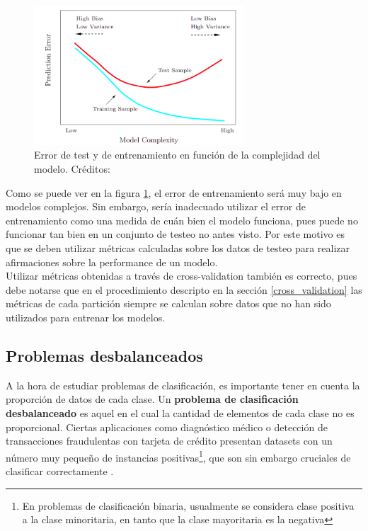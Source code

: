 \begin{figure}[h!]
\begin{center}
  \includegraphics[width=0.7\textwidth]{Kap1/tradeoff.png} 
  \end{center}
 \caption{ Error de test y de entrenamiento en función de la complejidad del modelo. Créditos: \protect\cite{statisticallearning} }
\label{fig:tradeoff}
\end{figure}

Como se puede ver en la figura \ref{fig:tradeoff}, el error de entrenamiento será muy bajo en modelos complejos. Sin embargo, sería inadecuado utilizar el error de entrenamiento como una medida de cuán bien el modelo funciona, pues puede no funcionar tan bien en un conjunto de testeo no antes visto. Por este motivo es que se deben utilizar métricas calculadas sobre los datos de testeo para realizar afirmaciones sobre la performance de un modelo. \\

Utilizar métricas obtenidas a través de cross-validation también es correcto, pues debe notarse que en el procedimiento descripto en la sección \ref{cross_validation} las métricas de cada partición siempre se calculan sobre datos que no han sido utilizados para entrenar los modelos.

\subsection{Problemas desbalanceados}
\label{imbalance}

A la hora de estudiar problemas de clasificación, es importante tener en cuenta la proporción de datos de cada clase. Un \textbf{problema de clasificación desbalanceado} es aquel en el cual la cantidad de elementos de cada clase no es proporcional. Ciertas aplicaciones como diagnóstico médico o detección de transacciones fraudulentas con tarjeta de crédito presentan datasets con un número muy pequeño de instancias positivas\footnote{En problemas de clasificación binaria, usualmente se considera clase positiva a la clase minoritaria, en tanto que la clase mayoritaria es la negativa}, que son sin embargo cruciales de clasificar correctamente \cite{imbalanced_svm}. \\

